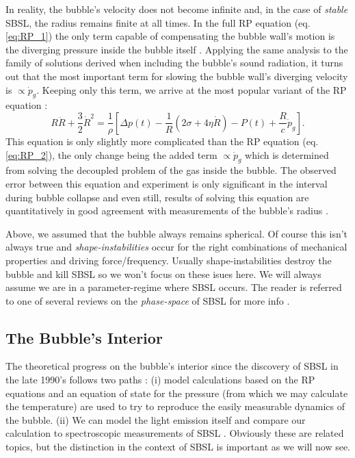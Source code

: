 \documentclass[prb,aps,nofootinbib,superscriptaddress,floatfix]{revtex4-2}
\begin{document}
In reality, the bubble's velocity does not become infinite and, in the case of \emph{stable} SBSL, the radius remains finite at all times. In the full RP equation (eq. \ref{eq:RP_1}) the only term capable of compensating the bubble wall's motion is the diverging pressure inside the bubble itself \cite{brenner2002single}. Applying the same analysis to the family of solutions derived when including the bubble's sound radiation, it turns out that the most important term for slowing the bubble wall's diverging velocity is $\propto\dot{p}_g$. Keeping only this term, we arrive at the most popular variant of the RP equation \cite{lofstedt1995sonoluminescing,barber1997defining}:
\begin{equation}
    R\ddot{R}+\frac{3}{2}\dot{R}^2 = \frac{1}{\rho} \left[ \Delta p(t)-\frac{1}{R}\left( 2\sigma+4\eta \dot{R} \right)-P(t) +\frac{R}{c} \dot{p}_g \right].
    \label{eq:RP_3}
\end{equation}
This equation is only slightly more complicated than the RP equation (eq. \ref{eq:RP_2}), the only change being the added term $\propto \dot{p}_g$ which is determined from solving the decoupled problem of the gas inside the bubble. The observed error between this equation and experiment is only significant in the interval during bubble collapse and even still, results of solving this equation are quantitatively in good agreement with measurements of the bubble's radius \cite{brenner2002single}. 

Above, we assumed that the bubble always remains spherical. Of course this isn't always true and \emph{shape-instabilities} occur for the right combinations of mechanical properties and driving force/frequency. Usually shape-instabilities destroy the bubble and kill SBSL so we won't focus on these isues here. We will always assume we are in a parameter-regime where SBSL occurs. The reader is referred to one of several reviews on the \emph{phase-space} of SBSL for more info \cite{yasui2018acoustic,brenner2002single,hilgenfeldt1999sonoluminescence,an2009diagnosing}. 


\subsection{The Bubble's Interior}
The theoretical progress on the bubble's interior since the discovery of SBSL in the late 1990's \cite{gaitan1992sonoluminescence} follows two paths \cite{brenner2002single,suslick2008inside,yasui2018acoustic}: (i) model calculations based on the RP equations and an equation of state for the pressure (from which we may calculate the temperature) are used to try to reproduce the easily measurable dynamics of the bubble. (ii) We can model the light emission itself and compare our calculation to spectroscopic measurements of SBSL \cite{hiller1992spectrum,brenner2002single}. Obviously these are related topics, but the distinction in the context of SBSL is important as we will now see.
\end{document}
